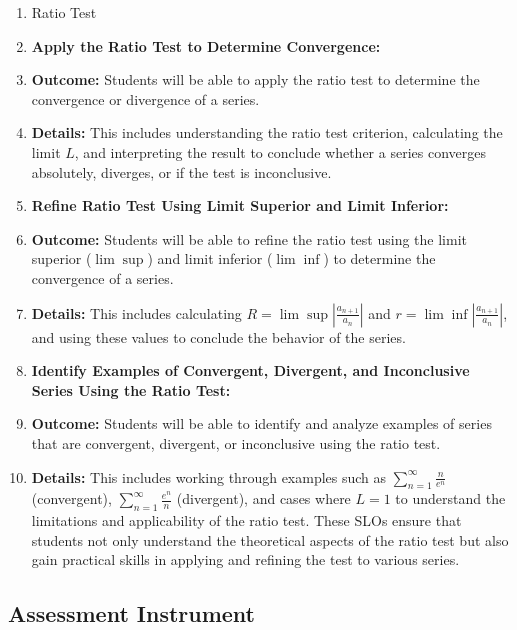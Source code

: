 \begin{enumerate}
    \item Ratio Test
    \item \textbf{Apply the Ratio Test to Determine Convergence:}
    \item \textbf{Outcome:} Students will be able to apply the ratio test to determine the convergence or divergence of a series.
    \item \textbf{Details:} This includes understanding the ratio test criterion, calculating the limit \( L \), and interpreting the result to conclude whether a series converges absolutely, diverges, or if the test is inconclusive.
    \item \textbf{Refine Ratio Test Using Limit Superior and Limit Inferior:}
    \item \textbf{Outcome:} Students will be able to refine the ratio test using the limit superior (\(\lim\sup\)) and limit inferior (\(\lim\inf\)) to determine the convergence of a series.
    \item \textbf{Details:} This includes calculating \( R = \lim\sup \left|\frac{a_{n+1}}{a_n}\right| \) and \( r = \lim\inf \left|\frac{a_{n+1}}{a_n}\right| \), and using these values to conclude the behavior of the series.
    \item \textbf{Identify Examples of Convergent, Divergent, and Inconclusive Series Using the Ratio Test:}
    \item \textbf{Outcome:} Students will be able to identify and analyze examples of series that are convergent, divergent, or inconclusive using the ratio test.
    \item \textbf{Details:} This includes working through examples such as \( \sum_{n=1}^\infty \frac{n}{e^n} \) (convergent), \( \sum_{n=1}^\infty \frac{e^n}{n} \) (divergent), and cases where \( L = 1 \) to understand the limitations and applicability of the ratio test. These SLOs ensure that students not only understand the theoretical aspects of the ratio test but also gain practical skills in applying and refining the test to various series.
\end{enumerate}

\subsection{Assessment Instrument}

